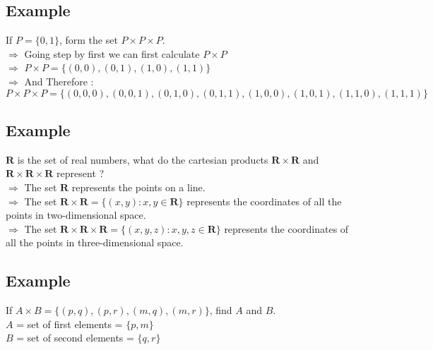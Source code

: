 \documentclass[12pt, letterpaper]{article}
\begin{document}
\subsection{Example}
If $P = \{0,1\}$, form the set $P\times P \times P$. \\
$\Rightarrow$ Going step by first we can first calculate $P \times P$ \\
$\Rightarrow$ $P \times P = \{(0,0), (0,1), (1,0), (1,1)\}$ \\
$\Rightarrow$ And Therefore :
\begin{displaymath}
P \times P \times P = \{(0,0,0), (0,0,1), (0,1,0), (0,1,1), (1,0,0), (1,0,1), (1,1,0), (1,1,1)\}
\end{displaymath}

\subsection{Example}
$\mathbf{R}$ is the set of real numbers, what do the cartesian products $\mathbf{R} \times \mathbf{R}$ and $\mathbf{R} \times \mathbf{R} \times \mathbf{R}$ represent ?\\
$\Rightarrow$ The set $\mathbf{R}$ represents the points on a line.\\
$\Rightarrow$ The set $\mathbf{R} \times \mathbf{R} = \{(x,y): x,y \in \mathbf{R}\}$ represents the coordinates of all the points in two-dimensional space.\\
$\Rightarrow$ The set $\mathbf{R} \times \mathbf{R} \times \mathbf{R} = \{(x,y,z): x,y,z \in \mathbf{R}\}$ represents the coordinates of all the points in three-dimensional space.

\subsection{Example}
If $A \times B = \{(p,q),(p,r),(m,q),(m,r)\}$, find $A$ and $B$. \\
$A$ = set of first elements = $\{p,m\}$\\
$B$ = set of second elements = $\{q,r\}$
\end{document}
